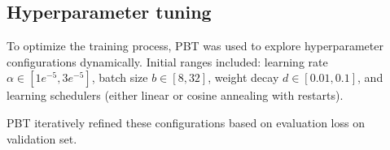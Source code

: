 \documentclass{article}
\newcounter{para}
\begin{document}
\subsection{Hyperparameter tuning}

To optimize the training process, PBT was used to explore hyperparameter configurations dynamically. Initial ranges included: learning rate $\alpha \in [1e^{-5}, 3e^{-5}]$, batch size $b\in [8,32]$, weight decay $d\in[0.01,0.1]$, and learning schedulers (either linear or cosine annealing with restarts).

PBT iteratively refined these configurations based on evaluation loss on validation set.
\end{document}
